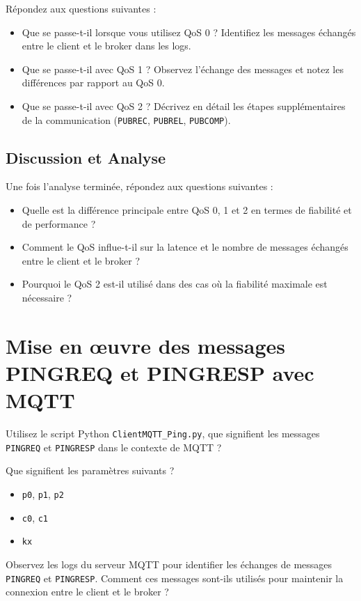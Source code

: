 \documentclass{article}
\begin{document}
Répondez aux questions suivantes :

\begin{itemize}
    \item Que se passe-t-il lorsque vous utilisez QoS 0 ? Identifiez les messages échangés entre le client et le broker dans les logs.
    \item Que se passe-t-il avec QoS 1 ? Observez l'échange des messages et notez les différences par rapport au QoS 0.
    \item Que se passe-t-il avec QoS 2 ? Décrivez en détail les étapes supplémentaires de la communication (\texttt{PUBREC}, \texttt{PUBREL}, \texttt{PUBCOMP}).
\end{itemize}

\subsection{Discussion et Analyse}

Une fois l'analyse terminée, répondez aux questions suivantes :
\begin{itemize}
    \item Quelle est la différence principale entre QoS 0, 1 et 2 en termes de fiabilité et de performance ?
    \item Comment le QoS influe-t-il sur la latence et le nombre de messages échangés entre le client et le broker ?
    \item Pourquoi le QoS 2 est-il utilisé dans des cas où la fiabilité maximale est nécessaire ?
\end{itemize}

\section{Mise en œuvre des messages PINGREQ et PINGRESP avec MQTT}

Utilisez le script Python \texttt{ClientMQTT\_Ping.py}, que signifient les messages \texttt{PINGREQ} et \texttt{PINGRESP} dans le contexte de MQTT ?

Que signifient les paramètres suivants ?

\begin{itemize}
    \item \texttt{p0}, \texttt{p1}, \texttt{p2}
    \item \texttt{c0}, \texttt{c1}
    \item \texttt{kx}
\end{itemize}

Observez les logs du serveur MQTT pour identifier les échanges de messages \texttt{PINGREQ} et \texttt{PINGRESP}. Comment ces messages sont-ils utilisés pour maintenir la connexion entre le client et le broker ?
\end{document}
